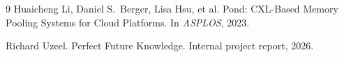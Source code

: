\documentclass[11pt]{article}
\begin{document}

\begin{thebibliography}{9}
Huaicheng Li, Daniel S.\ Berger, Lisa Hsu, et al.
\newblock Pond: {CXL}-Based Memory Pooling Systems for Cloud Platforms.
\newblock In \textit{ASPLOS}, 2023.

Richard Uzeel.
\newblock Perfect Future Knowledge.
\newblock Internal project report, 2026.
\end{thebibliography}
\end{document}
